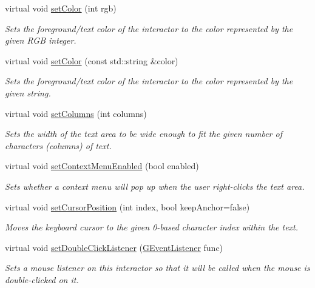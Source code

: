 \begin{DoxyCompactItemize}
virtual void \mbox{\hyperlink{classsgl_1_1GInteractor_ab1f5cc0f5cc6bbbd716a526c61f1081d}{set\+Color}} (int rgb)
\begin{DoxyCompactList}\small\item\em Sets the foreground/text color of the interactor to the color represented by the given R\+GB integer. \end{DoxyCompactList}\item 
virtual void \mbox{\hyperlink{classsgl_1_1GInteractor_a61374df6c11b52cfbb0815decdbaebc6}{set\+Color}} (const std\+::string \&color)
\begin{DoxyCompactList}\small\item\em Sets the foreground/text color of the interactor to the color represented by the given string. \end{DoxyCompactList}\item 
virtual void \mbox{\hyperlink{classsgl_1_1GTextArea_a3f29cc2956a84cdbce6327f1da4d86e9}{set\+Columns}} (int columns)
\begin{DoxyCompactList}\small\item\em Sets the width of the text area to be wide enough to fit the given number of characters (columns) of text. \end{DoxyCompactList}\item 
virtual void \mbox{\hyperlink{classsgl_1_1GTextArea_a1a83404ffa5c72d747681b3505e73001}{set\+Context\+Menu\+Enabled}} (bool enabled)
\begin{DoxyCompactList}\small\item\em Sets whether a context menu will pop up when the user right-\/clicks the text area. \end{DoxyCompactList}\item 
virtual void \mbox{\hyperlink{classsgl_1_1GTextArea_a5817e10a86be5cd41b3668d8fccb10e0}{set\+Cursor\+Position}} (int index, bool keep\+Anchor=false)
\begin{DoxyCompactList}\small\item\em Moves the keyboard cursor to the given 0-\/based character index within the text. \end{DoxyCompactList}\item 
virtual void \mbox{\hyperlink{classsgl_1_1GInteractor_ac29f9a3462458e165fae3a1f046ee77a}{set\+Double\+Click\+Listener}} (\mbox{\hyperlink{namespacesgl_ae9f3e9eab70035da1a2b114e21357b25}{G\+Event\+Listener}} func)
\begin{DoxyCompactList}\small\item\em Sets a mouse listener on this interactor so that it will be called when the mouse is double-\/clicked on it. \end{DoxyCompactList}\item 

\end{DoxyCompactItemize}
